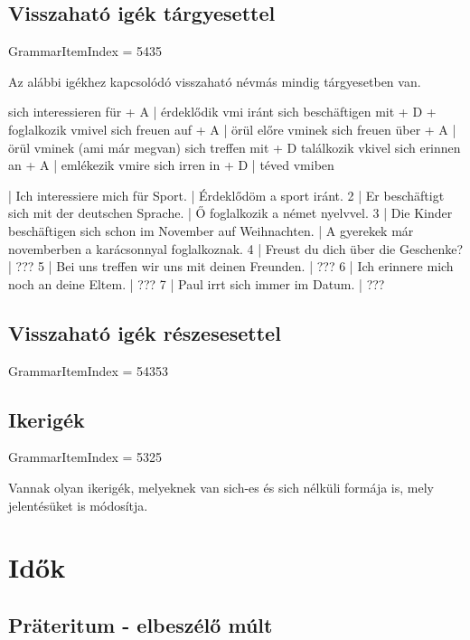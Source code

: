 \documentclass{article}
\newenvironment{desc}{\verbatim}{\endverbatim}
\newenvironment{exmp}{\verbatim}{\endverbatim}
\begin{document}
\subsection{Visszaható igék tárgyesettel}

GrammarItemIndex = 5435

\begin{desc}
Az alábbi igékhez kapcsolódó visszaható névmás mindig tárgyesetben van.


sich interessieren für + A | érdeklődik vmi iránt
sich beschäftigen mit + D + foglalkozik vmivel
sich freuen auf + A | örül előre vminek
sich freuen über + A | örül vminek (ami már megvan)
sich treffen mit + D  találkozik vkivel
sich erinnen an + A | emlékezik vmire
sich irren in + D | téved vmiben

\end{desc}

\begin{exmp}
1 | Ich interessiere mich für Sport. | Érdeklődöm a sport iránt.
2 | Er beschäftigt sich mit der deutschen Sprache. | Ő foglalkozik a német nyelvvel.
3 | Die Kinder beschäftigen sich schon im November auf Weihnachten. | A gyerekek már novemberben a karácsonnyal foglalkoznak.
4 | Freust du dich über die Geschenke? | ???
5 | Bei uns treffen wir uns mit deinen Freunden. | ???
6 | Ich erinnere mich noch an deine Eltem. | ???
7 | Paul irrt sich immer im Datum. | ???
\end{exmp}

\subsection{Visszaható igék részesesettel}

GrammarItemIndex = 54353

\subsection{Ikerigék}

GrammarItemIndex = 5325

\begin{desc}
Vannak olyan ikerigék, melyeknek van sich-es és sich nélküli
formája is, mely jelentésüket is módosítja.
\end{desc}

\section{Idők}

\subsection{Präteritum - elbeszélő múlt}
\end{document}
